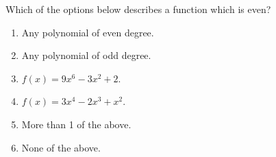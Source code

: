 \bigskip

\item Which of the options below describes a function which is even?

\begin{enumerate}
\item Any polynomial of even degree.
\item Any polynomial of odd degree.
\item $f(x) = 9x^6 - 3x^2 + 2$.
\item $f(x) = 3x^4 - 2x^3 + x^2$.
\item More than 1 of the above.
\item None of the above.
\end{enumerate}


